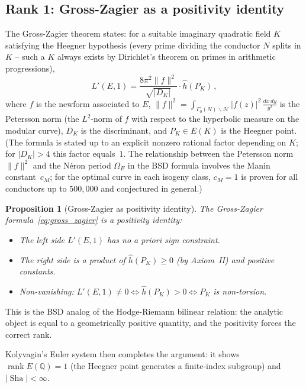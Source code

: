 \documentclass[aps,prd,twocolumn,superscriptaddress,nofootinbib]{revtex4-2}
\newtheorem{proposition}[theorem]{Proposition}
\theoremstyle{definition}
\theoremstyle{remark}
\DeclareMathOperator{\rank}{rank}
\DeclareMathOperator{\Sha}{Sha}
\begin{document}
\subsection{Rank 1: Gross-Zagier as a positivity identity}

The Gross-Zagier theorem \cite{GrossZagier1986} states: for a suitable imaginary quadratic field $K$ satisfying the Heegner hypothesis (every prime dividing the conductor $N$ splits in $K$ -- such a $K$ always exists by Dirichlet's theorem on primes in arithmetic progressions),
\begin{equation}
L'(E,1) = \frac{8\pi^2 \|f\|^2}{\sqrt{|D_K|}} \cdot \hat{h}(P_K)\,,
\label{eq:gross_zagier}
\end{equation}
where $f$ is the newform associated to $E$, $\|f\|^2 = \int_{\Gamma_0(N) \backslash \mathcal{H}} |f(z)|^2 \, \frac{dx\,dy}{y^2}$ is the Petersson norm (the $L^2$-norm of $f$ with respect to the hyperbolic measure on the modular curve), $D_K$ is the discriminant, and $P_K \in E(K)$ is the Heegner point. (The formula is stated up to an explicit nonzero rational factor depending on $K$; for $|D_K| > 4$ this factor equals~$1$. The relationship between the Petersson norm $\|f\|^2$ and the N\'eron period $\Omega_E$ in the BSD formula involves the Manin constant~$c_M$; for the optimal curve in each isogeny class, $c_M = 1$ is proven for all conductors up to $500{,}000$ and conjectured in general.)

\begin{proposition}[Gross-Zagier as positivity identity]
\label{prop:gz_positivity}
The Gross-Zagier formula~\eqref{eq:gross_zagier} is a positivity identity:
\begin{itemize}
\item The left side $L'(E,1)$ has no a priori sign constraint.
\item The right side is a product of $\hat{h}(P_K) \geq 0$ (by Axiom~II) and positive constants.
\item Non-vanishing: $L'(E,1) \neq 0 \iff \hat{h}(P_K) > 0 \iff P_K$ is non-torsion.
\end{itemize}
\end{proposition}

This is the BSD analog of the Hodge-Riemann bilinear relation: the analytic object is equal to a geometrically positive quantity, and the positivity forces the correct rank.

Kolyvagin's Euler system then completes the argument: it shows $\rank E(\mathbb{Q}) = 1$ (the Heegner point generates a finite-index subgroup) and $|\Sha| < \infty$.
\end{document}
